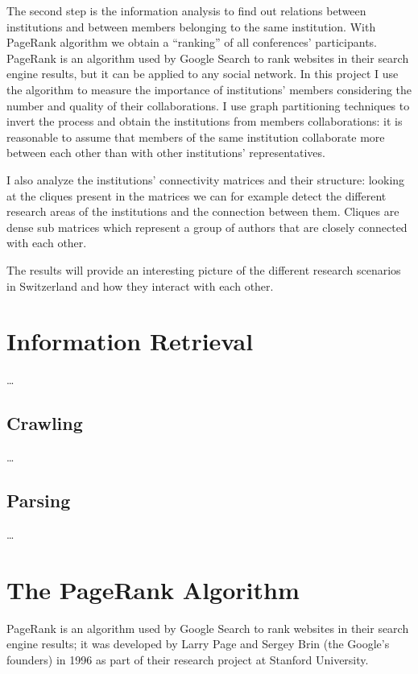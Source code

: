 \documentclass[]{usiinfbachelorproject}
\begin{document}
The second step is the information analysis to find out relations between institutions and between members belonging to the same institution. With PageRank algorithm we obtain a ``ranking'' of all conferences' participants.
PageRank is an algorithm used by Google Search to rank websites in their search engine results, but it can be applied to any social network. In this project I use the algorithm to measure the importance of institutions' members considering the number and quality of their collaborations. I use graph partitioning techniques to invert the process and obtain the institutions from members collaborations: it is reasonable to assume that members of the same institution collaborate more between each other than with other institutions' representatives.

I also analyze the institutions' connectivity matrices and their structure: looking at the cliques present in the matrices we can for example detect the different research areas of the institutions and the connection between them. Cliques are dense sub matrices which represent a group of authors that are closely connected with each other. 

The results will provide an interesting picture of the different research scenarios in Switzerland and how they interact with each other.






\section{Information Retrieval} \label{sec:inforetrieval} 

\ldots

\subsection{Crawling}

\ldots

\subsection{Parsing}

\ldots






\section{The PageRank Algorithm} \label{sec:pagerank} 
PageRank is an algorithm used by Google Search to rank websites in their search engine results; it was developed by  Larry Page and  Sergey Brin (the Google's founders) in 1996 as part of their research project at Stanford University.
\end{document}
